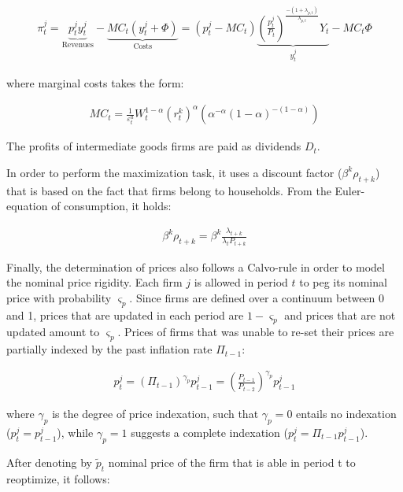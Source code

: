 \documentclass{pracamgr}
\numberwithin{equation}{section}
\begin{document}
\begin{align} \label{Nominal profits}
\pi_{t}^{j} = \underbrace{p_{t}^{j} y_{t}^{j}}_\text{Revenues} - \underbrace{MC_{t} \left(y_{t}^{j} + \Phi \right)}_\text{Costs} = \left(p_{t}^{j} - MC_{t} \right) \underbrace{\left( \frac{p_{t}^{j}}{P_{t}} \right)^{\frac{-(1+\lambda_{p,t})}{\lambda_{p,t}}} Y_{t}}_{y_{t}^{j}} - MC_{t}\Phi
\end{align}

where marginal costs takes the form:

\begin{align}
MC_{t} = \frac{1}{\varepsilon_{t}^{a}} W_{t}^{1-\alpha} \left(r_{t}^{k} \right)^{\alpha} \left( \alpha^{-\alpha} (1-\alpha)^{-(1-\alpha)}\right)
\end{align}

The profits of intermediate goods firms are paid as dividends $D_{t}$.

In order to perform the maximization task, it uses a discount factor ($\beta^{k} \rho_{t +k}$) that is based on the fact that firms belong to households. From the Euler-equation of consumption, it holds:


\begin{align} \label{Euler for firm}
\beta^{k} \rho_{t +k} = \beta^{k} \frac{\lambda_{t+k}}{\lambda_{t}P_{t+k}}
\end{align} 

Finally, the determination of prices also follows a Calvo-rule in order to model the nominal price rigidity. Each firm $j$ is allowed in period $t$ to peg its nominal price with probability $\varsigma_{p}$. Since firms are defined over a continuum between 0 and 1, prices that are updated in each period are $1-\varsigma_{p}$ and prices that are not updated amount to $\varsigma_{p}$. Prices of firms that was unable to re-set their prices are partially indexed by the past inflation rate $\Pi_{t-1}$:

\begin{align}
p_{t}^{j} = \left( \Pi_{t-1} \right)^{\gamma_{p}}p_{t-1}^{j} = \left( \frac{P_{t-1}}{P_{t-2}} \right)^{\gamma_{p}}p_{t-1}^{j}
\end{align}

where $\gamma_{p}$ is the degree of price indexation, such that $\gamma_{p} = 0$ entails no indexation ($p_{t}^{j} = p_{t-1}^{j}$), while $\gamma_{p} = 1$ suggests a complete indexation ($p_{t}^{j} = \Pi_{t-1} p_{t-1}^{j}$).

After denoting by $\widetilde{p}_{t}$ nominal price of the firm that is able in period t to reoptimize, it follows:
\end{document}
